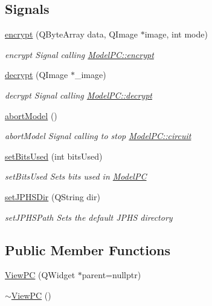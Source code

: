 \subsection*{Signals}
\begin{DoxyCompactItemize}
\item 
\mbox{\hyperlink{class_view_p_c_ade35449b95cf1c5424c4eb929f46fd73}{encrypt}} (Q\+Byte\+Array data, Q\+Image $\ast$image, int mode)
\begin{DoxyCompactList}\small\item\em encrypt Signal calling \mbox{\hyperlink{class_model_p_c_a8ef76567bc0c0307b4e2547c46536e51}{Model\+P\+C\+::encrypt}} \end{DoxyCompactList}\item 
\mbox{\hyperlink{class_view_p_c_acf8feb98f757cc238dada1df2308e303}{decrypt}} (Q\+Image $\ast$\+\_\+image)
\begin{DoxyCompactList}\small\item\em decrypt Signal calling \mbox{\hyperlink{class_model_p_c_af1f0b21565bf39808c4cdd448fad0ea8}{Model\+P\+C\+::decrypt}} \end{DoxyCompactList}\item 
\mbox{\hyperlink{class_view_p_c_a863f5233af3791bd165a2811a5d9bcc2}{abort\+Model}} ()
\begin{DoxyCompactList}\small\item\em abort\+Model Signal calling to stop \mbox{\hyperlink{class_model_p_c_a1d0091062a0c836b283ec2f67411623b}{Model\+P\+C\+::circuit}} \end{DoxyCompactList}\item 
\mbox{\hyperlink{class_view_p_c_a2ccc0a3f2f48080ae6308e800646fcd5}{set\+Bits\+Used}} (int bits\+Used)
\begin{DoxyCompactList}\small\item\em set\+Bits\+Used Sets bits used in \mbox{\hyperlink{class_model_p_c}{Model\+PC}} \end{DoxyCompactList}\item 
\mbox{\hyperlink{class_view_p_c_ababceedc355ecc1217a4c708e19e5e6b}{set\+J\+P\+H\+S\+Dir}} (Q\+String dir)
\begin{DoxyCompactList}\small\item\em set\+J\+P\+H\+S\+Path Sets the default J\+P\+HS directory \end{DoxyCompactList}\end{DoxyCompactItemize}
\subsection*{Public Member Functions}
\begin{DoxyCompactItemize}
\item 
\mbox{\hyperlink{class_view_p_c_a33c96c61f61042319c66c19059836b7f}{View\+PC}} (Q\+Widget $\ast$parent=nullptr)
\item 
\mbox{\hyperlink{class_view_p_c_a91c51f5c1e6ed5ab12b410339f469b0f}{$\sim$\+View\+PC}} ()
\end{DoxyCompactItemize}
